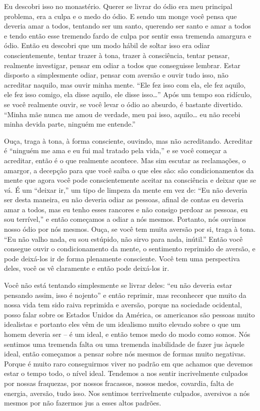Eu descobri isso no monastério. Querer se livrar do ódio era meu
principal problema, era a culpa e o medo do ódio. E sendo um monge você
pensa que deveria amar a todos, tentando ser um santo, querendo ser
santo e amar a todos e tendo então esse tremendo fardo de culpa por
sentir essa tremenda amargura e ódio. Então eu descobri que um modo
hábil de soltar isso era odiar conscientemente, tentar trazer à tona,
trazer à consciência, tentar pensar, realmente investigar, pensar em
odiar a todos que conseguisse lembrar. Estar disposto a simplesmente
odiar, pensar com aversão e ouvir tudo isso, não acreditar naquilo, mas
ouvir minha mente. “Ele fez isso com ela, ele fez aquilo, ele fez isso
comigo, ela disse aquilo, ele disse isso\ldots{}” Após um tempo soa ridículo,
se você realmente ouvir, se você levar o ódio ao absurdo, é bastante
divertido. “Minha mãe nunca me amou de verdade, meu pai isso, aquilo\ldots{}
eu não recebi minha devida parte, ninguém me entende.” 

Ouça, traga à tona, à forma consciente, ouvindo, mas não
acreditando. Acreditar é “ninguém me ama e eu fui mal tratado pela
vida,” e se você começar a acreditar, então é o que realmente acontece.
Mas sim escutar as reclamações, o amargor, a decepção para que você
saiba o que eles são: são condicionamentos da mente que agora você pode
conscientemente aceitar na consciência e deixar que se vá. É um “deixar
ir,” um tipo de limpeza da mente em vez de: “Eu não deveria ser desta
maneira, eu não deveria odiar as pessoas, afinal de contas eu deveria
amar a todos, mas eu tenho esses rancores e não consigo perdoar as
pessoas, eu sou terrível,” e então começamos a odiar a nós mesmos.
Portanto, nós ouvimos nosso ódio por nós mesmos. Ouça, se você tem
muita aversão por si, traga à tona. “Eu não valho nada, eu sou
estúpido, não sirvo para nada, inútil.” Então você consegue ouvir o
condicionamento da mente, o sentimento reprimido de aversão, e pode
deixá-los ir de forma plenamente consciente. Você tem uma perspectiva
deles, você os vê claramente e então pode deixá-los ir.

Você não está tentando simplesmente se livrar deles: “eu não deveria
estar pensando assim, isso é nojento” e então reprimir, mas reconhecer
que muito da nossa vida tem sido raiva reprimida e aversão, porque na
sociedade ocidental, posso falar sobre os Estados Unidos da América, os
americanos são pessoas muito idealistas e portanto eles vêm de um
idealismo muito elevado sobre o que um homem deveria ser – é um ideal,
e então temos medo do modo como somos. Nós sentimos uma tremenda falta
ou uma tremenda inabilidade de fazer jus àquele ideal, então começamos
a pensar sobre nós mesmos de formas muito negativas. Porque é muito
raro conseguirmos viver no padrão em que achamos que devemos estar o
tempo todo, o nível ideal. Tendemos a nos sentir incrivelmente culpados
por nossas fraquezas, por nossos fracassos, nossos medos, covardia,
falta de energia, aversão, tudo isso. Nos sentimos terrivelmente
culpados, aversivos a nós mesmos por não fazermos jus a esses altos
padrões.


